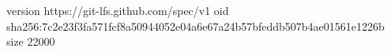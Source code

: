 version https://git-lfs.github.com/spec/v1
oid sha256:7c2e23f3fa571fcf8a50944052e04a6e67a24b57bfeddb507b4ae01561e1226b
size 22000
